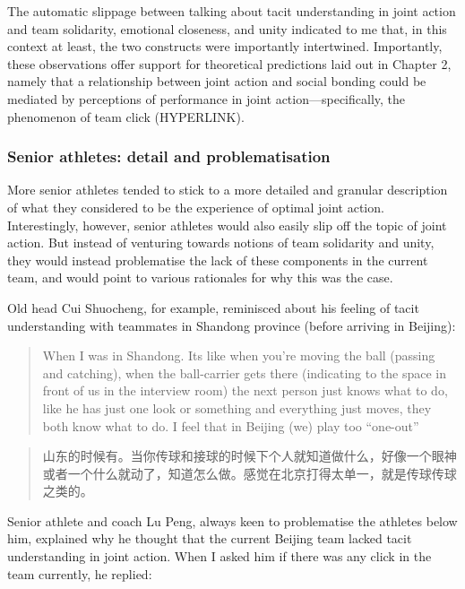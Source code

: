 \begin{CJK}{UTF8}{gbsn}
The automatic slippage between talking about tacit understanding in joint action and team solidarity, emotional closeness, and unity indicated to me that, in this context at least, the two constructs were importantly intertwined. Importantly, these observations offer support for theoretical predictions laid out in Chapter 2, namely that a relationship between joint action and social bonding could be mediated by perceptions of performance in joint action---specifically, the phenomenon of team click (HYPERLINK).


\subsubsection{Senior athletes: detail and problematisation}
More senior athletes tended to stick to a more detailed and granular description of what they considered to be the experience of optimal joint action. Interestingly, however, senior athletes would also easily slip off the topic of joint action.  But instead of venturing towards notions of team solidarity and unity, they would instead problematise the lack of these components in the current team, and would point to various rationales for why this was the case.

Old head Cui Shuocheng, for example, reminisced about his feeling of tacit understanding with teammates in Shandong province (before arriving in Beijing):

\begin{quotation}
      When I was in Shandong. Its like when you're moving the ball (passing and catching), when the ball-carrier gets there (indicating to the space in front of us in the interview room) the next person just knows what to do, like he has just one look or something and everything just moves, they both know what to do. I feel that in Beijing (we) play too ``one-out''
\end{quotation}

\begin{quotation}
     	山东的时候有。当你传球和接球的时候下个人就知道做什么，好像一个眼神或者一个什么就动了，知道怎么做。感觉在北京打得太单一，就是传球传球之类的。
\end{quotation}


Senior athlete and coach Lu Peng, always keen to problematise the athletes below him, explained why he thought that the current Beijing team lacked tacit understanding in joint action.  When I asked him if there was any click in the team currently, he replied:


\end{CJK}
